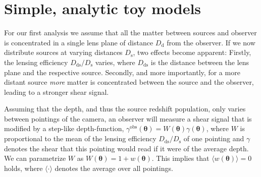 \documentclass{aa}
\renewcommand{\rm}{\mathrm}
\def\b#1{\bm{#1}}
\def\Dds{D_{\rm{ds}}}
\def\Ds{D_{\rm{s}}}
\def\gammao{\gamma^{\text{obs}}}
\begin{document}
\section{Simple, analytic toy models}
\label{sec:analytic_models}
For our first analysis we assume that all the matter between sources and observer is concentrated in a single lens plane of distance $D_{\rm d}$ from the observer. If we now distribute sources at varying distances $D_{\rm s}$, two effects become apparent: Firstly, the lensing efficiency $D_{\rm{ds}}/D_{\rm s}$ varies, where $D_{\rm{ds}}$ is the distance between the lens plane and the respective source. Secondly, and more importantly, for a more distant source \emph{more} matter is concentrated between the source and the observer, leading to a stronger shear signal.

Assuming that the depth, and thus the source redshift population, only varies between pointings of the camera, an observer will measure a shear signal that is modified by a step-like depth-function, $\gammao(\b\theta)=W(\b \theta)\gamma(\b\theta)$, where $W$ is proportional to the mean of the lensing efficiency $\Dds/\Ds$ of one pointing and $\gamma$ denotes the shear that this pointing would read if it were of the average depth.
We can parametrize $W$ as $W(\bm{\theta}) = 1+w(\bm{\theta})$. This implies that $\langle w(\bm{\theta})\rangle=0$ holds, where $\langle \cdot\rangle$ denotes the average over all pointings.
\end{document}
